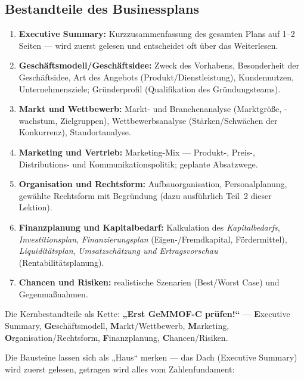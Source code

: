 \documentclass[11pt, a4paper]{article}
\begin{document}
\subsection{Bestandteile des Businessplans}

\begin{enumerate}
  \item \textbf{Executive Summary:} Kurzzusammenfassung des gesamten Plans auf 1--2
    Seiten --- wird zuerst gelesen und entscheidet oft über das Weiterlesen.
  \item \textbf{Geschäftsmodell/Geschäftsidee:} Zweck des Vorhabens, Besonderheit der
    Geschäftsidee, Art des Angebots (Produkt/Dienstleistung), Kundennutzen,
    Unternehmensziele; Gründerprofil (Qualifikation des Gründungsteams).
  \item \textbf{Markt und Wettbewerb:} Markt- und Branchenanalyse (Marktgröße, -wachstum,
    Zielgruppen), Wettbewerbsanalyse (Stärken/Schwächen der Konkurrenz), Standortanalyse.
  \item \textbf{Marketing und Vertrieb:} Marketing-Mix --- Produkt-, Preis-,
    Distributions- und Kommunikationspolitik; geplante Absatzwege.
  \item \textbf{Organisation und Rechtsform:} Aufbauorganisation, Personalplanung,
    gewählte Rechtsform mit Begründung (dazu ausführlich Teil~2 dieser Lektion).
  \item \textbf{Finanzplanung und Kapitalbedarf:} Kalkulation des \emph{Kapitalbedarfs},
    \emph{Investitionsplan}, \emph{Finanzierungsplan} (Eigen-/Fremdkapital, Fördermittel),
    \emph{Liquiditätsplan}, \emph{Umsatzschätzung und Ertragsvorschau}
    (Rentabilitätsplanung).
  \item \textbf{Chancen und Risiken:} realistische Szenarien (Best/Worst Case) und
    Gegenmaßnahmen.
\end{enumerate}

\begin{eselsbruecke}
Die Kernbestandteile als Kette: \textbf{„Erst GeMMOF-C prüfen!{}``} ---
\textbf{E}xecutive Summary, \textbf{Ge}schäftsmodell, \textbf{M}arkt/Wettbewerb,
\textbf{M}arketing, \textbf{O}rganisation/Rechtsform, \textbf{F}inanzplanung,
\textbf{C}hancen/Risiken.
\end{eselsbruecke}

Die Bausteine lassen sich als „Haus`` merken --- das Dach (Executive Summary) wird
zuerst gelesen, getragen wird alles vom Zahlenfundament:
\end{document}
